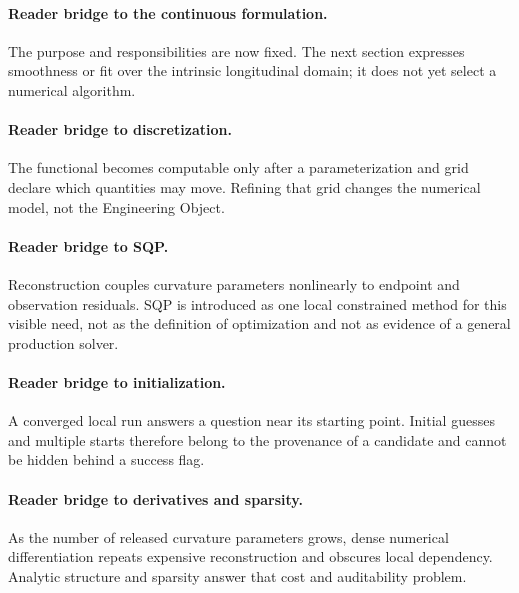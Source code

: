 

\paragraph{Reader bridge to the continuous formulation.}
The purpose and responsibilities are now fixed. The next section expresses
smoothness or fit over the intrinsic longitudinal domain; it does not yet
select a numerical algorithm.


\paragraph{Reader bridge to discretization.}
The functional becomes computable only after a parameterization and grid
declare which quantities may move. Refining that grid changes the numerical
model, not the Engineering Object.


\paragraph{Reader bridge to SQP.}
Reconstruction couples curvature parameters nonlinearly to endpoint and
observation residuals. SQP is introduced as one local constrained method for
this visible need, not as the definition of optimization and not as evidence
of a general production solver.


\paragraph{Reader bridge to initialization.}
A converged local run answers a question near its starting point. Initial
guesses and multiple starts therefore belong to the provenance of a candidate
and cannot be hidden behind a success flag.


\paragraph{Reader bridge to derivatives and sparsity.}
As the number of released curvature parameters grows, dense numerical
differentiation repeats expensive reconstruction and obscures local
dependency. Analytic structure and sparsity answer that cost and auditability
problem.


